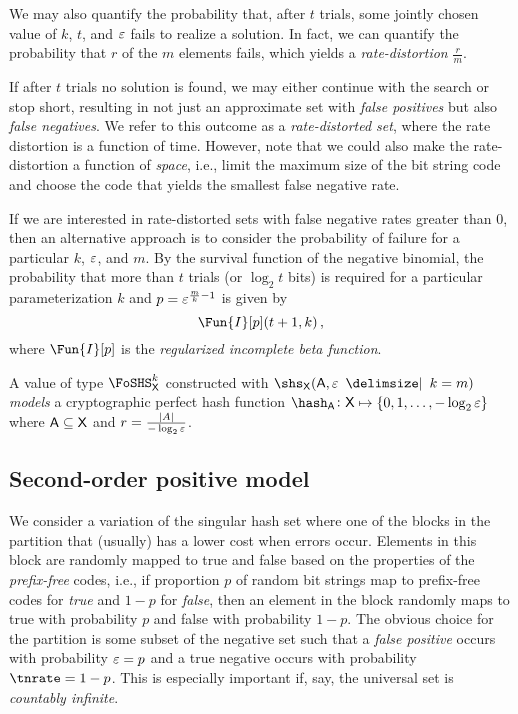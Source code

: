 \documentclass[ ../main.tex]{subfiles}
\begin{document}
We may also quantify the probability that, after $t$ trials, some jointly chosen value of $k$, $t$, and $\varepsilon$ fails to realize a solution.
In fact, we can quantify the probability that $r$ of the $m$ elements fails, which yields a \emph{rate-distortion} $\frac{r}{m}$.

If after $t$ trials no solution is found, we may either continue with the search or stop short, resulting in not just an approximate set with \emph{false positives} but also \emph{false negatives}.
We refer to this outcome as a \emph{rate-distorted set}, where the rate distortion is a function of time.
However, note that we could also make the rate-distortion a function of \emph{space}, i.e., limit the maximum size of the bit string code and choose the code that yields the smallest false negative rate.


If we are interested in rate-distorted sets with false negative rates greater than $0$, then an alternative approach is to consider the probability of failure for a particular $k$, $\varepsilon$, and $m$.
By the survival function of the negative binomial, the probability that more than $t$ trials (or $\log_2 t$ bits) is required for a particular parameterization $k$ and $p = \varepsilon^{\frac{m}{k}-1}$ is given by
\begin{equation}
    \Fun{I}[p](t+1, k)\,,
\end{equation}
where $\Fun{I}[p]$ is the \emph{regularized incomplete beta function}.





\begin{theorem}
    A value of type $\FoSHS_{\Set{X}}^{k}$ constructed with $\shs_{\Set{X}}(\Set{A},\fprate \; \Given \; k = m)$ \emph{models} a cryptographic perfect hash function $\hash_{\Set{A}} \colon \Set{X} \mapsto \{0,1,\ldots,-\log_2 \fprate\}$ where $\Set{A} \subseteq \Set{X}$ and $r = \frac{\lvert A\rvert}{-\log_2 \varepsilon}$.
\end{theorem}



\subsection{Second-order positive model}
We consider a variation of the singular hash set where one of the blocks in the partition that (usually) has a lower cost when errors occur.
Elements in this block are randomly mapped to true and false based on the properties of the \emph{prefix-free} codes, i.e., if proportion $p$ of random bit strings map to prefix-free codes for \emph{true} and $1-p$ for \emph{false}, then an element in the block randomly maps to true with probability $p$ and false with probability $1-p$.
The obvious choice for the partition is some subset of the negative set such that a \emph{false positive} occurs with probability $\varepsilon = p$ and a true negative occurs with probability $\tnrate = 1-p$.
This is especially important if, say, the universal set is \emph{countably infinite}.
\end{document}
